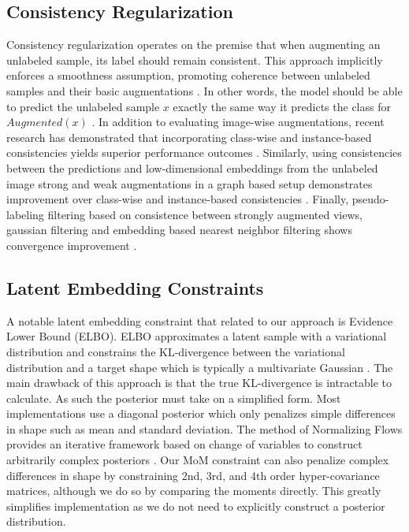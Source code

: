 \documentclass[10pt,twocolumn,letterpaper]{article}
\begin{document}
\subsection{Consistency Regularization}

Consistency regularization operates on the premise that when augmenting an unlabeled sample, its label should remain consistent. 
This approach implicitly enforces a smoothness assumption, promoting coherence between unlabeled samples and their basic augmentations \cite{xie2020unsupervised}. 
In other words, the model should be able to predict the unlabeled sample $x$ exactly the same way it predicts the class for $Augmented(x)$ \cite{berthelot2019mixmatch,sohn2020fixmatch,berthelot2019remixmatch,mustafa2020transformation}. 
In addition to evaluating image-wise augmentations, recent research has demonstrated that incorporating class-wise and instance-based consistencies yields superior performance outcomes \cite{zheng2022simmatch,li2021comatch}. 
Similarly, using consistencies between the predictions and low-dimensional embeddings from the unlabeled image strong and weak augmentations in a graph based setup demonstrates improvement over class-wise and instance-based consistencies \cite{zheng2023simmatchv2}.
Finally, pseudo-labeling filtering based on consistence between strongly augmented views, gaussian filtering and embedding based nearest neighbor filtering shows convergence improvement \cite{kim2022conmatch,menon2022semisupervised}.

\subsection{Latent Embedding Constraints}

A notable latent embedding constraint that related to our approach is Evidence Lower Bound (ELBO).
ELBO approximates a latent sample with a variational distribution and constrains the KL-divergence between the variational distribution and a target shape which is typically a multivariate Gaussian \cite{kingma2013auto}. 
The main drawback of this approach is that the true KL-divergence is intractable to calculate.  
As such the posterior must take on a simplified form. 
Most implementations use a diagonal posterior which only penalizes simple differences in shape such as mean and standard deviation.  
The method of Normalizing Flows provides an iterative framework based on change of variables to construct arbitrarily complex posteriors \cite{rezende2015variational,kingma2016improved,caterini2021variational}.  
Our MoM constraint can also penalize complex differences in shape by constraining 2nd, 3rd, and 4th order hyper-covariance matrices, although we do so by comparing the moments directly.  
This greatly simplifies implementation as we do not need to explicitly construct a posterior distribution.
\end{document}
